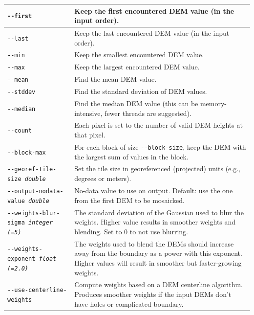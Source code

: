 \begin{longtable}{|l|p{10cm}|}
\texttt{-\/-first}
& Keep the first encountered DEM value (in the input order).
\\ \hline

\texttt{-\/-last}
& Keep the last encountered DEM value (in the input order).
\\ \hline

\texttt{-\/-min}
& Keep the smallest encountered DEM value.
\\ \hline

\texttt{-\/-max}
& Keep the largest encountered DEM value.
\\ \hline

\texttt{-\/-mean}
& Find the mean DEM value.
\\ \hline

\texttt{-\/-stddev}
& Find the standard deviation of DEM values.
\\ \hline

\texttt{-\/-median}
& Find the median DEM value (this can be memory-intensive, fewer threads are suggested).
\\ \hline

\texttt{-\/-count}
& Each pixel is set to the number of valid DEM heights at that pixel.
\\ \hline

\texttt{-\/-block-max} & For each block of size \texttt{-\/-block-size}, keep the DEM with the largest sum of values in the block.\\ \hline

\texttt{-\/-georef-tile-size \textit{double}} &
Set the tile size in georeferenced (projected) units (e.g., degrees or meters).
\\ \hline
\texttt{-\/-output-nodata-value \textit{double}} &
No-data value to use on output. Default: use the one from the first DEM to be mosaicked.
\\ \hline

\texttt{-\/-weights-blur-sigma \textit{integer (=5)} } &
The standard deviation of the Gaussian used to blur the weights. Higher value results in smoother weights and blending. Set to 0 to not use blurring.
\\ \hline

\texttt{-\/-weights-exponent \textit{float (=2.0)} } &
The weights used to blend the DEMs should increase away from the boundary as a power with this exponent. Higher values will result in smoother but faster-growing weights.
\\ \hline

\texttt{-\/-use-centerline-weights} &
Compute weights based on a DEM centerline algorithm. Produces smoother weights if the input DEMs don't have holes or complicated boundary.
\\ \hline


\end{longtable}

